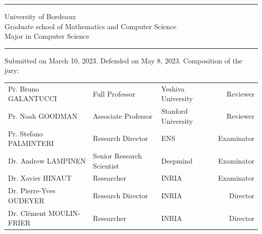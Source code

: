 {\begin{center}
{\begin{large}
\begin{normalsize}
            \rule{0.05\textwidth}{0.4pt}

            University of Bordeaux \\
            Graduate school of Mathematics and Computer Science \\
            Major in Computer Science \\
        \end{normalsize}
    	\vspace{0.2cm}
        \rule{0.2\textwidth}{0.6pt}

    \end{large}
    }
\end{center}

\begin{small}
    
\noindent Submitted on March 10, 2023. Defended on May 8, 2023.
\vfill
\noindent Composition of the jury:

\begin{table}[b]
\centering
\small
\begin{tabular}{lllr}
Pr. Bruno GALANTUCCI & Full Professor & Yeshiva University & Reviewer \\
Pr. Noah GOODMAN & Associate Professor & Stanford University & Reviewer \\
Pr. Stefano PALMINTERI & Research Director & ENS & Examinator \\
Dr. Andrew LAMPINEN & Senior Research Scientist & Deepmind & Examinator\\
Dr. Xavier HINAUT & Researcher & INRIA & Examinator \\
Dr. Pierre-Yves OUDEYER & Research Director & INRIA & Director \\
Dr. Cl\'ement MOULIN-FRIER & Researcher & INRIA & Director
\end{tabular}

\end{table}
\end{small}


}

